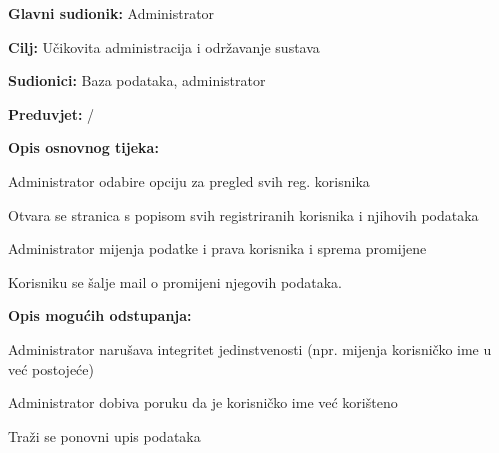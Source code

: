 						\begin{packed_item}
						
						\item \textbf{Glavni sudionik: } Administrator
						\item  \textbf{Cilj:} Učikovita administracija i održavanje sustava
						\item  \textbf{Sudionici:} Baza podataka, administrator
						\item  \textbf{Preduvjet:}  / 
						\item  \textbf{Opis osnovnog tijeka:}
						
						\item[] \begin{packed_enum}
							\item Administrator odabire opciju za pregled svih reg. korisnika
							\item Otvara se stranica s popisom svih registriranih korisnika i njihovih podataka
							\item Administrator mijenja podatke i prava korisnika i sprema promijene			
							\item Korisniku se šalje mail o promijeni njegovih podataka.
						\end{packed_enum}
						
						\item  \textbf{Opis mogućih odstupanja:}
						
						\item[] \begin{packed_item}
							
							\item[3.a]Administrator narušava integritet jedinstvenosti (npr. mijenja korisničko ime u već postojeće)
							\item[] \begin{packed_enum}
								
								\item Administrator dobiva poruku da je korisničko ime već korišteno
								\item Traži se ponovni upis podataka
								
							\end{packed_enum}
								
							\end{packed_item}
							
							
						\end{packed_item}
					\noindent {}
